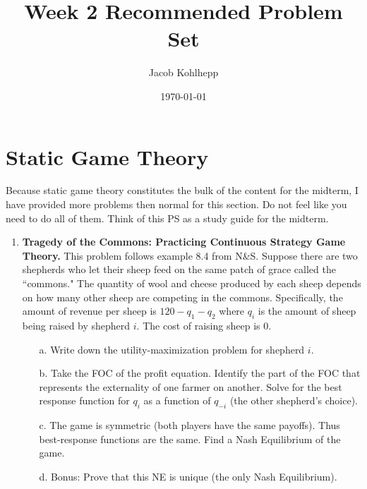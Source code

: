 \documentclass{article}
\begin{document}
\title{Week 2 Recommended Problem Set}
\author{Jacob Kohlhepp}
\date{\today}

\maketitle

\section{Static Game Theory}
Because static game theory constitutes the bulk of the content for the midterm, I have provided more problems then normal for this section. Do not feel like you need to do all of them. Think of this PS as a study guide for the midterm.

\begin{enumerate}
    \item \textbf{Tragedy of the Commons: Practicing Continuous Strategy Game Theory.} This problem follows example 8.4 from N\&S. Suppose there are two shepherds who let their sheep feed on the same patch of grace called the ``commons." The quantity of wool and cheese produced by each sheep depends on how many other sheep are competing in the commons. Specifically, the amount of revenue per sheep is $120-q_1-q_2$ where $q_i$ is the amount of sheep being raised by shepherd $i$. The cost of raising sheep is 0.
    \begin{enumerate}
        \item[a.] Write down the utility-maximization problem for shepherd $i$.
        
        \vspace{4cm}
        
        \item[b.] Take the FOC of the profit equation. Identify the part of the FOC that represents the externality of one farmer on another. Solve for the best response function for $q_i$ as a function of $q_{-i}$ (the other shepherd's choice).
        
        \vspace{4cm}
        
        \item[c.] The game is symmetric (both players have the same payoffs). Thus best-response functions are the same. Find a Nash Equilibrium of the game.
        
        \vspace{6cm}
        
        \item[d.] Bonus: Prove that this NE is unique (the only Nash Equilibrium).
        

\end{enumerate}
\end{enumerate}
\end{document}
